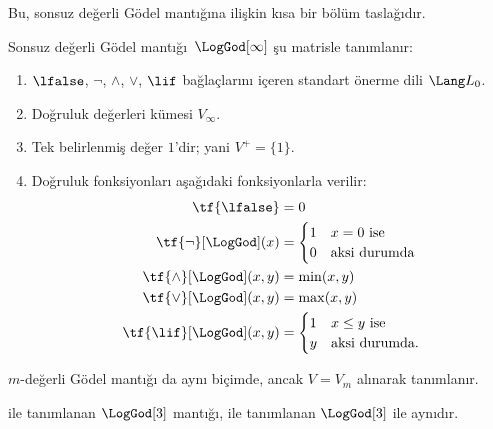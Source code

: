 \documentclass[../../../include/open-logic-section]{subfiles}
\begin{document}


\begin{editorial}
  Bu, sonsuz değerli G\"odel mantığına ilişkin kısa bir bölüm taslağıdır.
\end{editorial}

\begin{defn} Sonsuz değerli G\"odel
mantığı~$\LogGod[\infty]$ şu matrisle tanımlanır:
\begin{enumerate}
  \item $\lfalse$, $\lnot$, $\land$, $\lor$, $\lif$ bağlaçlarını içeren
  standart önerme dili $\Lang L_0$.
  \item Doğruluk değerleri kümesi $V_\infty$.
  \item Tek belirlenmiş değer $1$'dir; yani $V^+ = \{1\}$.
  \item Doğruluk fonksiyonları aşağıdaki fonksiyonlarla verilir:
  \begin{align*}
    \tf{\lfalse} & = 0\\
    \tf{\lnot}[\LogGod](x) & = \begin{cases}
      1 & \text{$x = 0$ ise}\\
      0 & \text{aksi durumda}
    \end{cases}\\
    \tf{\land}[\LogGod](x,y) & = \min(x,y)\\
    \tf{\lor}[\LogGod](x,y) & = \max(x,y)\\
    \tf{\lif}[\LogGod](x,y) & = \begin{cases}
      1 & \text{$x \le y$ ise}\\
      y & \text{aksi durumda.}
    \end{cases}
    \end{align*}
\end{enumerate}
$m$-değerli G\"odel mantığı da aynı biçimde, ancak $V = V_m$ alınarak
tanımlanır.
\end{defn}

\begin{prop}
   ile tanımlanan $\LogGod[3]$ mantığı,
   ile tanımlanan $\LogGod[3]$ ile aynıdır.
\end{prop}
\end{document}
